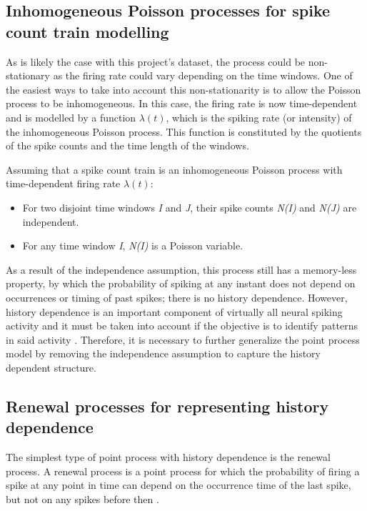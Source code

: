 \documentclass{article}
\begin{document}
\subsection{Inhomogeneous Poisson processes for spike count train modelling}

As is likely the case with this project's dataset, the process could be non-stationary as the firing rate could vary depending on the time windows. 
One of the easiest ways to take into account this non-stationarity is to allow the Poisson process to be inhomogeneous. 
In this case, the firing rate is now time-dependent and is modelled by a function \begin{math}\lambda(t)\end{math}, which is the spiking rate (or intensity) of the inhomogeneous Poisson process. 
This function is constituted by the quotients of the spike counts and the time length of the windows.

Assuming that a spike count train is an inhomogeneous Poisson process with time-dependent firing rate \begin{math}\lambda(t)\end{math}:

\begin{itemize}
    \item For two disjoint time windows \textit{I} and \textit{J}, their spike counts \textit{N(I)} and \textit{N(J)} are independent.
    \item For any time window \textit{I}, \textit{N(I)} is a Poisson variable.
\end{itemize}

As a result of the independence assumption, this process still has a memory-less property, by which the probability of spiking at any instant does not depend on occurrences or timing of past spikes; there is no history dependence. 
However, history dependence is an important component of virtually all neural spiking activity and it must be taken into account if the objective is to identify patterns in said activity \citep{Perkel}. 
Therefore, it is necessary to further generalize the point process model by removing the independence assumption to capture the history dependent structure.

\subsection{Renewal processes for representing history dependence}

The simplest type of point process with history dependence is the renewal process. 
A renewal process is a point process for which the probability of firing a spike at any point in time can depend on the occurrence time of the last spike, but not on any spikes before then  \citep{Perkel}. 
\end{document}
